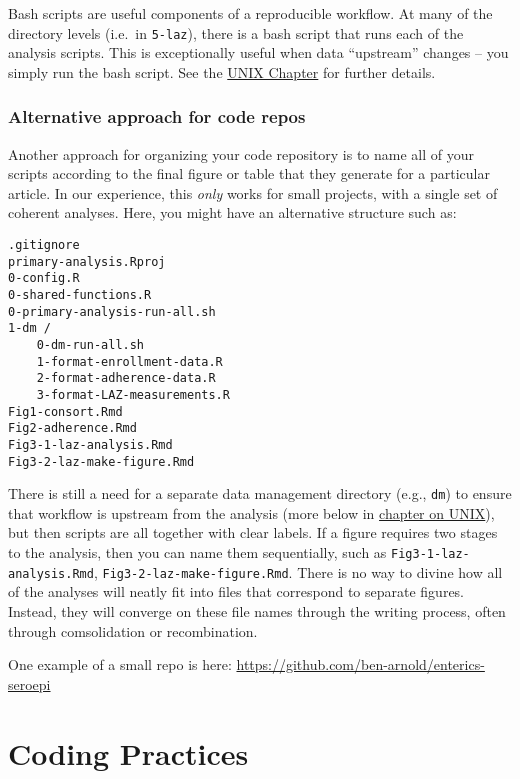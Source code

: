 \documentclass[
]{book}
\begin{document}
Bash scripts are useful components of a reproducible workflow. At many of the directory levels (i.e.~in \texttt{5-laz}), there is a bash script that runs each of the analysis scripts. This is exceptionally useful when data ``upstream'' changes -- you simply run the bash script. See the \protect\hyperlink{unix}{UNIX Chapter} for further details.

\hypertarget{alternative-approach-for-code-repos}{%
\subsection{Alternative approach for code repos}\label{alternative-approach-for-code-repos}}

Another approach for organizing your code repository is to name all of your scripts according to the final figure or table that they generate for a particular article. In our experience, this \emph{only} works for small projects, with a single set of coherent analyses. Here, you might have an alternative structure such as:

\begin{verbatim}
.gitignore
primary-analysis.Rproj
0-config.R
0-shared-functions.R
0-primary-analysis-run-all.sh
1-dm /
    0-dm-run-all.sh
    1-format-enrollment-data.R
    2-format-adherence-data.R
    3-format-LAZ-measurements.R
Fig1-consort.Rmd
Fig2-adherence.Rmd
Fig3-1-laz-analysis.Rmd
Fig3-2-laz-make-figure.Rmd
\end{verbatim}

There is still a need for a separate data management directory (e.g., \texttt{dm}) to ensure that workflow is upstream from the analysis (more below in \protect\hyperlink{unix}{chapter on UNIX}), but then scripts are all together with clear labels. If a figure requires two stages to the analysis, then you can name them sequentially, such as \texttt{Fig3-1-laz-analysis.Rmd}, \texttt{Fig3-2-laz-make-figure.Rmd}. There is no way to divine how all of the analyses will neatly fit into files that correspond to separate figures. Instead, they will converge on these file names through the writing process, often through comsolidation or recombination.

One example of a small repo is here:
\url{https://github.com/ben-arnold/enterics-seroepi}

\hypertarget{codingpractices}{%
\chapter{Coding Practices}\label{codingpractices}}
\end{document}
